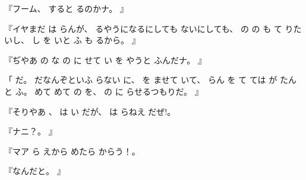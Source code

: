 『フーム、
すると
るのかナ。
』

『イヤまだ
は
らんが、
るやうになるにしても
ないにしても、
の
の
も
て
りたいし、
し
を
いと
ふ
も
るから。
』

『ぢやあ
の
な
の
に
せて
い
を
やうと
ふんだナ。
』

「
だ。
だなんぞといふ
らない
に、
を
ませて
いて、
らん
を
て
ては
が
たんと
ふ。
めて
めて
の
を、
の
に
らせるつもりだ。
』

『そりやあ
、
は
い
だが、
は
らねえ
だぜ!。

『ナニ？。
』

『マア
ら
えから
めたら
からう！。

『なんだと。
』

